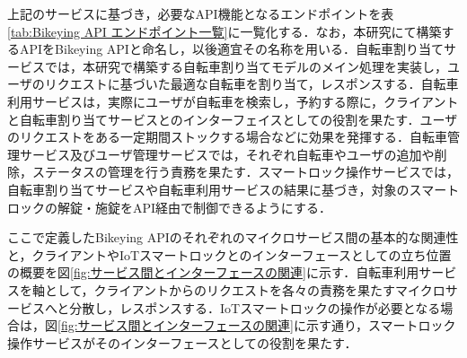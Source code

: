           \par 上記のサービスに基づき，必要なAPI機能となるエンドポイントを表\ref{tab:Bikeying API エンドポイント一覧}に一覧化する．なお，本研究にて構築するAPIをBikeying APIと命名し，以後適宜その名称を用いる．自転車割り当てサービスでは，本研究で構築する自転車割り当てモデルのメイン処理を実装し，ユーザのリクエストに基づいた最適な自転車を割り当て，レスポンスする．自転車利用サービスは，実際にユーザが自転車を検索し，予約する際に，クライアントと自転車割り当てサービスとのインターフェイスとしての役割を果たす．ユーザのリクエストをある一定期間ストックする場合などに効果を発揮する．自転車管理サービス及びユーザ管理サービスでは，それぞれ自転車やユーザの追加や削除，ステータスの管理を行う責務を果たす．スマートロック操作サービスでは，自転車割り当てサービスや自転車利用サービスの結果に基づき，対象のスマートロックの解錠・施錠をAPI経由で制御できるようにする．
          \par ここで定義したBikeying APIのそれぞれのマイクロサービス間の基本的な関連性と，クライアントやIoTスマートロックとのインターフェースとしての立ち位置の概要を図\ref{fig:サービス間とインターフェースの関連}に示す．自転車利用サービスを軸として，クライアントからのリクエストを各々の責務を果たすマイクロサービスへと分散し，レスポンスする．IoTスマートロックの操作が必要となる場合は，図\ref{fig:サービス間とインターフェースの関連}に示す通り，スマートロック操作サービスがそのインターフェースとしての役割を果たす．

